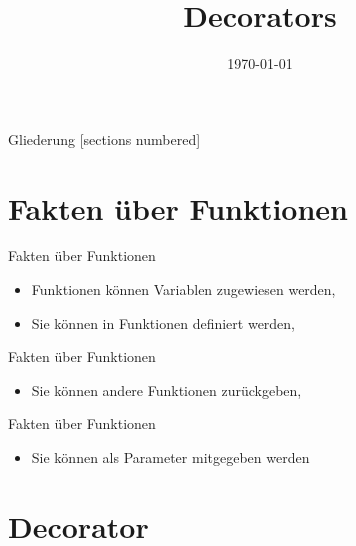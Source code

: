 


\usepackage{comment}
\title{Decorators}
\date{\today}




\maketitle

\begin{frame}{Gliederung}
		[sections numbered]
		\tableofcontents
\end{frame}


\section{Fakten über Funktionen}
\begin{frame}{Fakten über Funktionen}
	\begin{itemize}
		\item Funktionen können Variablen zugewiesen werden,
		
		\item Sie können in Funktionen definiert werden,
		
	\end{itemize}
\end{frame}
\begin{frame}{Fakten über Funktionen}
	\begin{itemize}
		\item Sie können andere Funktionen zurückgeben,
		
	\end{itemize}
\end{frame}
\begin{frame}{Fakten über Funktionen}
	\begin{itemize}
		\item Sie können als Parameter mitgegeben werden
		
	\end{itemize}
\end{frame}

\section{Decorator}
